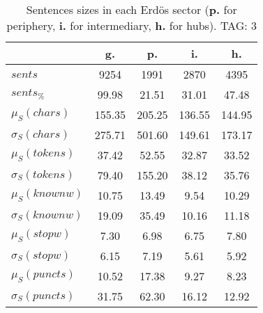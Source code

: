 \begin{table}[h!]
\begin{center}
\begin{tabular}{| l || c | c | c | c |}\hline
 & {\bf g.} & {\bf p.} & {\bf i.} & {\bf h.} \\\hline\hline
$sents$ & 9254  & 1991  & 2870  & 4395 \\
$sents_{\%}$ & 99.98  & 21.51  & 31.01  & 47.48 \\\hline
$\mu_S(chars)$ & 155.35  & 205.25  & 136.55  & 144.95 \\
$\sigma_S(chars)$ & 275.71  & 501.60  & 149.61  & 173.17 \\\hline
$\mu_S(tokens)$ & 37.42  & 52.55  & 32.87  & 33.52 \\
$\sigma_S(tokens)$ & 79.40  & 155.20  & 38.12  & 35.76 \\\hline
$\mu_S(knownw)$ & 10.75  & 13.49  & 9.54  & 10.29 \\
$\sigma_S(knownw)$ & 19.09  & 35.49  & 10.16  & 11.18 \\\hline
$\mu_S(stopw)$ & 7.30  & 6.98  & 6.75  & 7.80 \\
$\sigma_S(stopw)$ & 6.15  & 7.19  & 5.61  & 5.92 \\\hline
$\mu_S(puncts)$ & 10.52  & 17.38  & 9.27  & 8.23 \\
$\sigma_S(puncts)$ & 31.75  & 62.30  & 16.12  & 12.92 \\\hline
\end{tabular}
\caption{Sentences sizes in each Erd\"os sector ({{\bf p.}} for periphery, {{\bf i.}} for intermediary, {{\bf h.}} for hubs). TAG: 3}
\end{center}
\end{table}